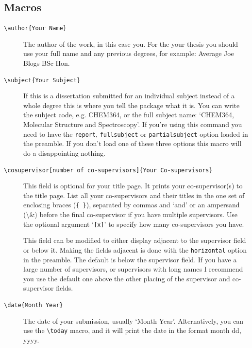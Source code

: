 \documentclass[12pt,oneside]{article}
\newcommand{\option}[1]{\texttt{\color{UOWblue}#1}}
\newcommand{\command}[1]{\texttt{\color{UOWred}#1}}
\newcommand{\comoptions}[1]{\texttt{\color{UOWdarkblue}#1}}
\begin{document}
\subsection*{Macros}
\begin{description}
    \item[\command{\textbackslash{}author}\comoptions{\{Your Name\}}]
    The author of the work, in this case you. For the your thesis you should use your full name and any previous degrees, for example: Average Joe Blogs BSc Hon.
    
    \item[\command{\textbackslash{}subject}\comoptions{\{Your Subject\}}] If this is a dissertation submitted for an individual subject instead of a whole degree this is where you tell the package what it is. You can write the subject code, e.g. CHEM364, or the full subject name: `CHEM364, Molecular Structure and Spectroscopy'. If you're using this command you need to have the \option{report}, \option{fullsubject} or \option{partialsubject} option loaded in the preamble. If you don't load one of these three options this macro will do a disappointing nothing.
    
    \item[\command{\textbackslash{}cosupervisor}\option{[number of co-supervisors]}\comoptions{\{Your Co-supervisors\}}] This field is optional for your title page. It prints your co-super\-visor(s) to the title page. List all your co-supervisors and their titles in the one set of enclosing braces (\comoptions{\{~\}}), separated by commas and `and' or an ampersand (\textbackslash{}\&) before the final co-supervisor if you have multiple supervisors. Use the optional argument `\option{[x]}' to specify how many co-supervisors you have.
    
    This field can be modified to either display adjacent to the supervisor field or below it. Making the fields adjacent is done with the \option{horizontal} option in the preamble. The default is below the supervisor field. If you have a large number of supervisors, or supervisors with long names I recommend you use the default one above the other placing of the supervisor and co-supervisor fields.
    
    \item[\command{\textbackslash{}date}\comoptions{\{Month Year\}}] The date of your submission, usually `Month Year'. Alternatively, you can use the \command{\textbackslash{}today} macro, and it will print the date in the format month dd, yyyy.
    

\end{description}
\end{document}
